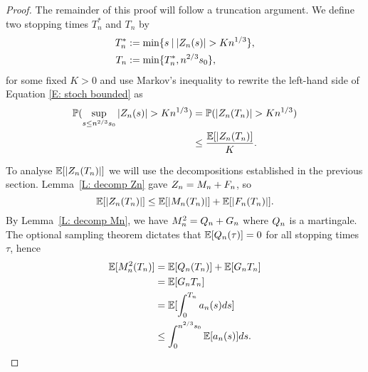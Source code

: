 \begin{proof}
    The remainder of this proof will follow a truncation argument.
    We define two stopping times $T^*_n$ and $T_n$ by
    \begin{align} 
    T^*_n &:= \min \lbrace s \: | \: |Z_n(s)| > K n^{1 / 3} \rbrace, \label{E: def T*n} \\
    T_n &:= \min \lbrace T^*_n, n^{2 / 3}s_0 \rbrace ,  \label{E: def Tn}
    \end{align}
    for some fixed $K>0$ and use Markov's inequality to rewrite the left-hand side of Equation \eqref{E: stoch bounded} as
    \begin{equation} \label{E: stoch bounded 2}
    \begin{aligned}
    \mathbb{P}( \sup_{s\leq n^{2/3} s_0} |Z_n(s)| > K n^{1 / 3} ) &= \mathbb{P}( |Z_n(T_n)| > Kn^{1 / 3} ) \\
    &\leq \frac{\mathbb{E}[|Z_n(T_n)]}{K}.
    \end{aligned} 
    \end{equation}
    
    To analyse $\mathbb{E}[|Z_n(T_n)|]$ we will use the decompositions established in the previous section. 
    Lemma~\ref{L: decomp Zn} gave $Z_n = M_n + F_n$,
    so \begin{equation} \label{E: Exp(|Zn|)}
    \mathbb{E}[|Z_n(T_n)|] \leq \mathbb{E}[|M_n(T_n)|] + \mathbb{E}[|F_n(T_n)|].
    \end{equation}
    By Lemma~\ref{L: decomp Mn}, we have $M^2_n = Q_n + G_n$ where $Q_n$ is a martingale. 
    The optional sampling theorem dictates that 
    $\mathbb{E}[Q_n(\tau)] = 0$ 
    for all stopping times $\tau$, hence 
    \begin{align*}
    \mathbb{E}[M^2_n(T_n)] 
    &= \mathbb{E}[Q_n(T_n)] + \mathbb{E}[G_n{T_n}] \\
    &= \mathbb{E}[G_n{T_n}] \\
    &= \mathbb{E}[ \int_{0}^{T_n} a_n(s)ds ] \\
    &\leq \int_{0}^{n^{2 / 3}s_0} \mathbb{E}[a_n(s)] ds.
    \end{align*}
    

\end{proof}
